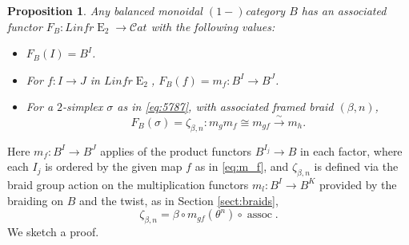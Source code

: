 \documentclass[reqno]{amsart}
\newtheorem{proposition}[lemma]{Proposition}
\theoremstyle{definition}
\newcommand{\msc}[1]{\mathscr{#1}}
\newcommand{\opn}[1]{\operatorname{#1}}
\newcommand{\sCat}{\msc{C}\!at}
\renewcommand{\1}{\mathbf{1}}
\begin{document}
\begin{proposition}\label{prop:balanced_fre2}
Any balanced monoidal $(1-)$category $B$ has an associated functor $F_B:Linfr\opn{E}_2\to \sCat$ with the following values:
\begin{itemize}
\item $F_B(I)=B^I$.\vspace{1mm}
\item For $f:I\to J$ in $Linfr\opn{E}_2$, $F_B(f)=m_f:B^I\to B^J$.\vspace{1mm}
\item For a $2$-simplex $\sigma$ as in \eqref{eq:5787}, with associated framed braid $(\beta,n)$,
\[
F_B(\sigma)=\zeta_{\beta,n}:m_gm_f\cong m_{gf}\overset{\sim}\to m_h.
\]
\end{itemize}
\end{proposition}

Here $m_f:B^I\to B^J$ applies of the product functors $B^{I_j}\to B$ in each factor, where each $I_j$ is ordered by the given map $f$ as in \eqref{eq:m_f}, and $\zeta_{\beta,n}$ is defined via the braid group action on the multiplication functors $m_l:B^I\to B^K$ provided by the braiding on $B$ and the twist, as in Section \ref{sect:braids},
\[
\zeta_{\beta,n}=\beta\circ m_{gf}(\theta^n)\circ\opn{assoc}.
\]
We sketch a proof.
\end{document}
